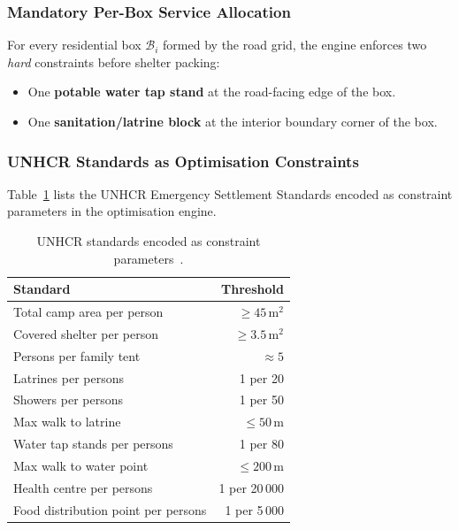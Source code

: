 \documentclass[twocolumn]{article}
\begin{document}
\subsubsection{Mandatory Per-Box Service Allocation}

For every residential box $\mathcal{B}_i$ formed by the road grid, the engine enforces two
\emph{hard} constraints before shelter packing:
\begin{itemize}[leftmargin=*,nosep,topsep=2pt]
  \item One \textbf{potable water tap stand} at the road-facing edge of the box.
  \item One \textbf{sanitation/latrine block} at the interior boundary corner of the box.
\end{itemize}

\subsubsection{UNHCR Standards as Optimisation Constraints}

Table~\ref{tab:unhcr} lists the UNHCR Emergency Settlement Standards encoded as
constraint parameters in the optimisation engine.

\begin{table}[h]
  \caption{UNHCR standards encoded as constraint parameters~\cite{unhcr_handbook}.}
  \label{tab:unhcr}
  \centering\small
  \setlength{\tabcolsep}{4pt}
  \begin{tabular}{@{}p{4.3cm}r@{}}
    \toprule
    \textbf{Standard} & \textbf{Threshold} \\
    \midrule
    Total camp area per person            & $\ge 45\,\mathrm{m}^2$ \\
    Covered shelter per person            & $\ge 3.5\,\mathrm{m}^2$ \\
    Persons per family tent               & $\approx 5$ \\
    Latrines per persons                  & 1 per 20 \\
    Showers per persons                   & 1 per 50 \\
    Max walk to latrine                   & $\le 50\,\mathrm{m}$ \\
    Water tap stands per persons          & 1 per 80 \\
    Max walk to water point               & $\le 200\,\mathrm{m}$ \\
    Health centre per persons             & 1 per 20\,000 \\
    Food distribution point per persons   & 1 per 5\,000 \\
    \bottomrule
  \end{tabular}
\end{table}
\end{document}
